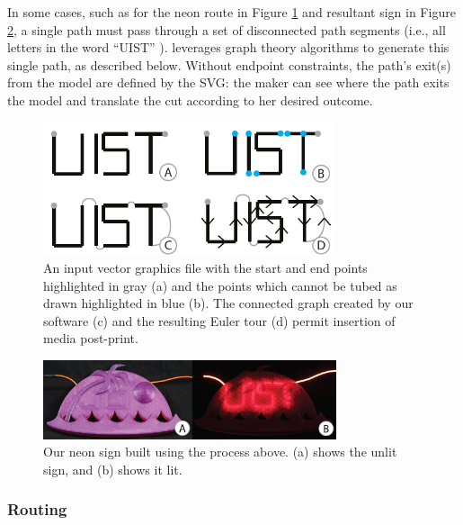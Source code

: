 In some cases, such as for the neon route in Figure \ref{fig:tool-process-interior} and resultant sign in Figure \ref{fig:UIST}, a single path must pass through a set of disconnected path segments (i.e., all letters in the word ``UIST'' ).  \systemname leverages graph theory algorithms to generate this single path, as described below.  Without endpoint constraints, the path's exit(s) from the model are defined by the SVG: the maker can see where the path exits the model and translate the cut according to her desired outcome.

\begin{figure}[h!]
\centering
    \includegraphics[width=3.4in]{figures/interior.pdf}
\caption{An input vector graphics file with the start and end points highlighted in {\color{gray}gray} (a) and the points which cannot be tubed as drawn highlighted in {\color{blue}blue} (b).  The connected graph created by our software (c) and the resulting Euler tour (d) permit insertion of media post-print.}
\label{fig:tool-process-interior}
\end{figure}

\begin{figure}[h!]
\centering
    \includegraphics[width=3.4in]{figures/uistphotos.png}
\caption{Our neon sign built using the process above.  (a) shows the unlit sign, and (b) shows it lit.}
\label{fig:UIST}
\end{figure}

\subsubsection{Routing}
%

